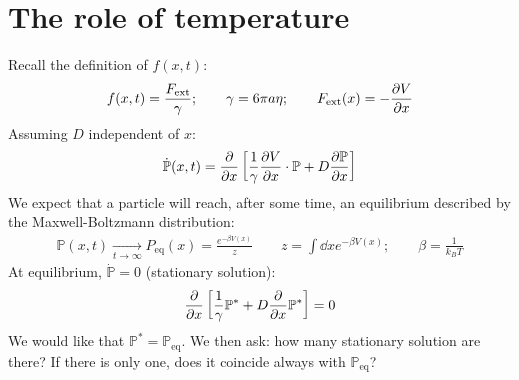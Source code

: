\documentclass[../template.tex]{subfiles}
\begin{document}
\section{The role of temperature}
Recall the definition of $f(x,t)$:
\begin{align*}
    f(x,t) = \frac{F_{\mathrm{ext} }}{\gamma}; \qquad \gamma = 6 \pi a \eta; \qquad F_{\mathrm{ext} }(x) = -\pdv{V}{x} (x) 
\end{align*} 
Assuming $D$ independent of $x$:
\begin{align*}
    \dot{\mathbb{P}}(x,t) = \pdv{x}\left[\frac{1}{\gamma} \pdv{V}{x} \cdot \mathbb{P} + D \pdv{\mathbb{P}}{x} \right]
\end{align*}  
We expect that a particle will reach, after some time, an equilibrium described by the Maxwell-Boltzmann distribution:
\begin{align*}
    \mathbb{P}(x,t)  \xrightarrow[t \to \infty]{}  P_{\mathrm{eq} }(x) = \frac{e^{- \beta V(x)}}{z} \qquad z = \int \dd{x} e^{- \beta V(x)}; \qquad \beta = \frac{1}{k_B T} 
\end{align*}
At equilibrium, $\dot{\mathbb{P}} = 0$ (stationary solution):
\begin{align*}
    \pdv{x}\left[\frac{1}{\gamma} \mathbb{P}^* + D \pdv{x} \mathbb{P}^* \right] = 0
\end{align*}
We would like that $\mathbb{P}^* = \mathbb{P}_{\mathrm{eq}}$. We then ask: how many stationary solution are there? If there is only one, does it coincide always with $\mathbb{P}_{\mathrm{eq} }$?\\
\end{document}
